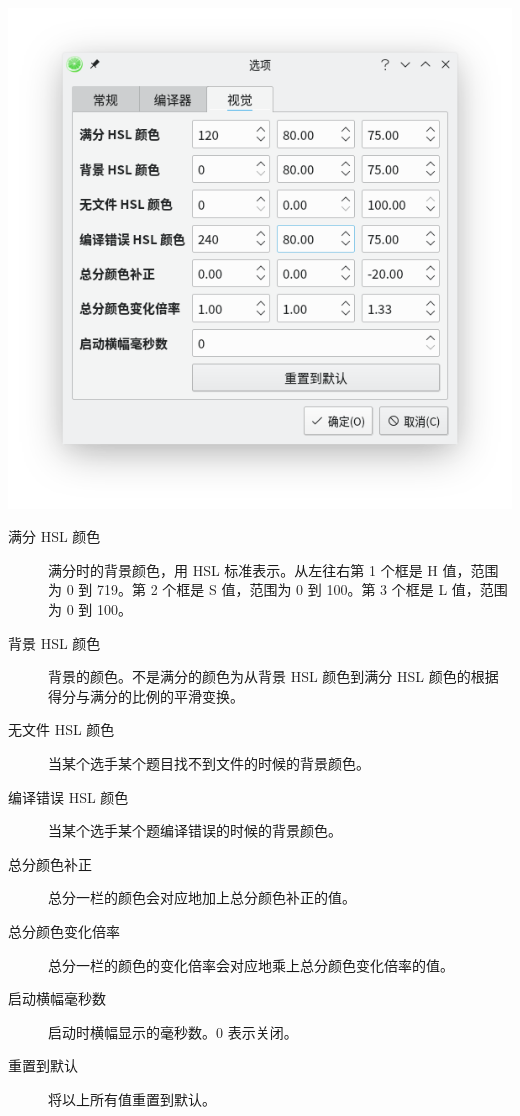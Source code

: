 \documentclass[UTF-8]{ctexart}
\begin{document}
				\begin{center}
				\includegraphics[scale=0.7]{pics/visualsettings.png}
				\end{center}
			
				\begin{description}
					\item[满分 HSL 颜色] 满分时的背景颜色，用 HSL 标准表示。从左往右第 1 个框是 H 值，范围为 0 到 719。第 2 个框是 S 值，范围为 0 到 100。第 3 个框是 L 值，范围为 0 到 100。
					\item[背景 HSL 颜色] 背景的颜色。不是满分的颜色为从背景 HSL 颜色到满分 HSL 颜色的根据得分与满分的比例的平滑变换。
					\item[无文件 HSL 颜色] 当某个选手某个题目找不到文件的时候的背景颜色。
					\item[编译错误 HSL 颜色] 当某个选手某个题编译错误的时候的背景颜色。
					\item[总分颜色补正] 总分一栏的颜色会对应地加上总分颜色补正的值。
					\item[总分颜色变化倍率] 总分一栏的颜色的变化倍率会对应地乘上总分颜色变化倍率的值。
					\item[启动横幅毫秒数] 启动时横幅显示的毫秒数。0 表示关闭。
					\item[重置到默认] 将以上所有值重置到默认。
				\end{description}
			
\end{document}
